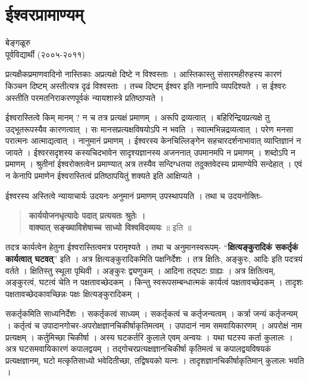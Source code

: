 {\fontsize{15}{17}\selectfont
\chapter{ईश्वरप्रामाण्यम्}

\begin{center}
\smallskip

बेङ्गळूरु\\
पूर्वविद्यार्थी (२००५-२०११)
\addrule
\end{center}
प्रत्यक्षैकप्रमाणवादिनो नास्तिकाः अप्रत्यक्षे दिष्टे न विश्वस्ताः । आस्तिकास्तु संसारमहीरुहस्य कारणं किञ्चन दिष्टम् अस्तीत्यत्र दृढं विश्वस्ताः । तच्च दिष्टम् ईश्वर इति नाम्नापि व्यपदिश्यते । स ईश्वरः अस्तीति परमतनिराकरणपूर्वकं न्यायशास्त्रे प्रतिष्ठाप्यते ।

ईश्वरास्तित्वे किम् मानम् ? न च तत्र प्रत्यक्षं प्रमाणम् । अरूपि द्रव्यत्वात् । बहिरिन्द्रियप्रत्यक्षे तु उद्भूतरूपस्यैव कारणत्वात् । सः मानसप्रत्यक्षविषयोऽपि न भवति । स्वात्मभिन्नद्रव्यत्वात् । परेण मनसा परात्मनः आत्माद्यत्वात् । नानुमानं प्रमाणम् । ईश्वरस्य केनचिल्लिङ्गेन सहचारदर्शनाभावात् व्याप्तिज्ञानं न जायते । ईश्वरसदृशस्य कस्यचिदभावेन सादृश्यज्ञानस्य अजननात् उपमानमपि न प्रमाणम् । शब्दोऽपि न प्रमाणम् । श्रुतीनां ईश्वरोक्तत्वेन प्रमाण्यात् अत्र तस्यैव सन्दिग्धतया तदुक्तवेदस्य प्रामाण्येपि सन्देहात् । एवं न केनापि प्रमाणेन ईश्वरास्तित्वं प्रतिष्ठापयितुं शक्यते इति आक्षिप्यते ।

ईश्वरस्य अस्तित्वे न्यायाचार्यः उदयनः अनुमानं प्रमाणम् उपस्थापयति । तथा च उदयनोक्तिः-
\begin{verse}
\textbf{कार्ययोजनधृत्यादेः पदात् प्रत्ययतः श्रुतेः ।\\
वाक्यात् सङ्ख्याविशेषाच्च साध्यो विश्वविदव्ययः} ॥ इति ॥
\end{verse}
तदत्र कार्यत्वेन हेतुना ईश्वरास्तित्वमत्र परामृश्यते । तथा च अनुमानस्वरूपम्- “\textbf{क्षित्यङ्कुरादिकं सकर्तृकं कार्यत्वात् घटवत्}” इति । अत्र क्षित्यङ्कुरादिकमिति पक्षनिर्देशः । तत्र क्षितिः, अङ्कुरः, आदिः इति पदत्रयं वर्तते । क्षितिस्तु स्थूला पृथिवी । अङ्कुरः द्व्यणुकम् । आदिना तद्घटः ग्राह्यः । अत्र क्षितित्वम्, अङ्कुरत्वं, घटत्वं चेति न पक्षतावच्छेदकम् । किन्तु स्वरूपसम्बन्धात्मकं कार्यत्वं पक्षतावच्छेदकम् । तादृशः पक्षतावच्छेदकावच्छिन्नः पक्षः क्षित्यङ्कुरादिकम् ।

सकर्तृकमिति साध्यनिर्देशः । सकर्तृकत्वं साध्यम् । सकर्तृकत्वं च कर्तृजन्यत्वम् । कर्त्रा जन्यं कर्तृजन्यम् । कर्तृत्वं च उपादानगोचर-अपरोक्षज्ञानचिकीर्षाकृतिमत्वम् । उपादानं नाम समवायिकारणम् । अपरोक्षं नाम प्रत्यक्षम् । कर्तुमिच्छा चिकीर्षा । अस्य घटकर्तरि कुलाले एवम् अन्वयः । यथा घटस्य कर्ता कुलालः । अत्र घटसमवायिकारणं कपालद्वयम् । तद्गोचरप्रत्यक्षज्ञानचिकीर्षा कृतिमत्वं च कपालद्वयविषयकं प्रत्यक्षज्ञानम्, घटो मत्कृतिसाध्यो भवेदितीच्छा, तद्विषयको यत्नः । तादृशज्ञानचिकीर्षाकृतिमान् कुलालः भवति ।

}
